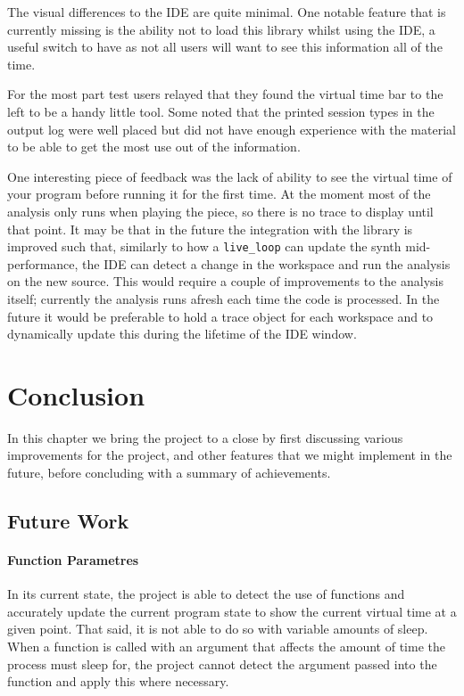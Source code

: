 \documentclass[11pt, abstracton, twoside, titlepage=true]{scrartcl}
\begin{document}
The visual differences to the IDE are quite minimal. One notable feature that is 
currently missing is the ability not to load this library whilst using the IDE, a 
useful switch to have as not all users will want to see this information all of the
time. 

For the most part test users relayed that they found the virtual time bar to the 
left to be a handy little tool. Some noted that the printed session types in the 
output log were well placed but did not have enough experience with the material 
to be able to get the most use out of the information. 

One interesting piece of 
feedback was the lack of ability to see the virtual time of your program before 
running it for the first time. At the moment most of the analysis only runs 
when playing the piece, so there is no trace to display until that point. It may 
be that in the future the integration with the library is improved such that, 
similarly to how a \texttt{live\_loop} can update the synth mid-performance,
the IDE can detect a change in the workspace and run the analysis on the new source. 
This would require a couple of improvements to the analysis itself; currently the 
analysis runs afresh each time the code is processed. In the future it would be
preferable to hold a trace object for each workspace and to dynamically update 
this during the lifetime of the IDE window. 



\newpage

\section{Conclusion}
\thispagestyle{empty}
In this chapter we bring the project to a close by first discussing various 
improvements for the project, and other features that we might implement 
in the future, before concluding with a summary of achievements. 

\subsection{Future Work}
\paragraph{Function Parametres}
In its current state, the project is able to detect the use of functions
and accurately update the current program state to show the current virtual
time at a given point. That said, it is not able to do so with variable
amounts of sleep. When a function is called with an argument that affects the
amount of time the process must sleep for, the project cannot detect the
argument passed into the function and apply this where necessary.
\end{document}
